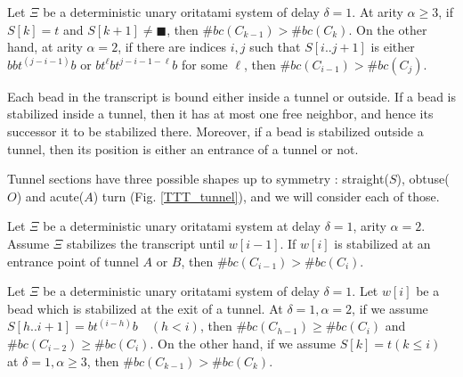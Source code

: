 
\begin{theorem}
Let $\Xi$ be a deterministic unary oritatami system of delay $\delta = 1$. 
At arity $\alpha \geq 3$, if $S[k] = t$ and $S[k+1] \neq \blacksquare$, then $\#bc(C_{k-1}) > \#bc(C_k)$.
On the other hand, at arity $\alpha = 2$, if there are indices $i,j$ such that $S[i..j+1]$ is either $bbt^{(j-i-1)}b$ or $bt^\ell bt^{j-i-1-\ell}b$ for some $\ell$, then $\#bc(C_{i-1}) > \#bc(C_j)$.
\end{theorem}



\proof%
Each bead in the transcript is bound either inside a tunnel or outside. If a bead is stabilized inside a tunnel, 
then it has at most one free neighbor, and hence its successor it to be stabilized there.
Moreover, if a bead is stabilized outside a tunnel, then its position is either an entrance of a tunnel or not.

Tunnel sections have three possible shapes up to symmetry : straight($S$), obtuse($O$) and acute($A$) turn (Fig. \ref{TTT_tunnel}), and we will consider each of those. 



\begin{lemma}
\label{TTT_entrance_Tab}
Let $\Xi$ be a deterministic unary oritatami system at delay $\delta = 1$, arity $\alpha =2$. 
Assume $\Xi$ stabilizes the transcript until $w[i-1]$. If $w[i]$ is stabilized at an entrance point of tunnel $A$ or $B$, then $\#bc(C_{i-1}) > \#bc(C_{i})$.
\end{lemma}

\begin{lemma}
\label{TTT_exit}
Let $\Xi$ be a deterministic unary oritatami system of delay $\delta = 1$. 
Let $w[i]$ be a bead which is stabilized at the exit of a tunnel.
At $\delta = 1, \alpha =2$, if we assume $S[h..i+1] = bt^{(i-h)}b \quad (h<i)$, then $\#bc(C_{h-1}) \geq \#bc(C_i)$ and $\#bc(C_{i-2}) \geq \#bc(C_i)$.
On the other hand, if we assume $S[k] = t (k \leq i)$ at $\delta =1, \alpha \geq 3$, then $\#bc(C_{k-1}) > \#bc(C_{k})$.
\end{lemma}

